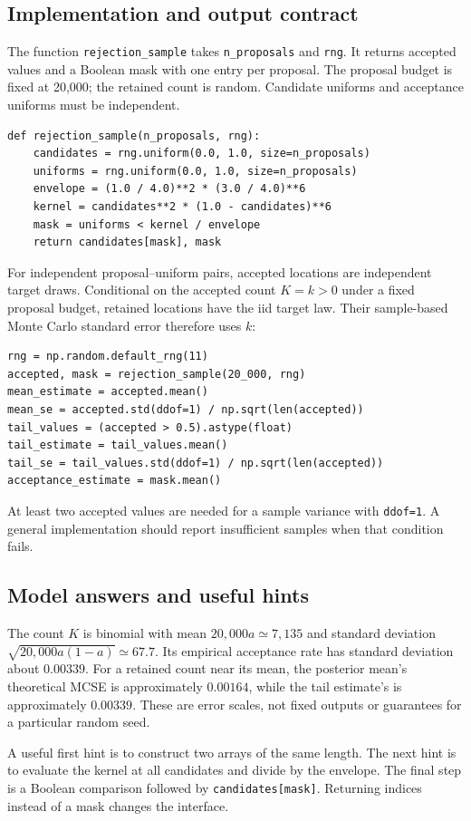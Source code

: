 \documentclass[11pt,a4paper]{article}
\begin{document}
\subsection{Implementation and output contract}
The function \texttt{rejection\_sample} takes \texttt{n\_proposals} and
\texttt{rng}. It returns accepted values and a Boolean mask with one entry per proposal. The proposal
budget is fixed at 20,000; the retained count is random. Candidate uniforms
and acceptance uniforms must be independent.
\begin{lstlisting}
def rejection_sample(n_proposals, rng):
    candidates = rng.uniform(0.0, 1.0, size=n_proposals)
    uniforms = rng.uniform(0.0, 1.0, size=n_proposals)
    envelope = (1.0 / 4.0)**2 * (3.0 / 4.0)**6
    kernel = candidates**2 * (1.0 - candidates)**6
    mask = uniforms < kernel / envelope
    return candidates[mask], mask
\end{lstlisting}
For independent proposal--uniform pairs, accepted locations are independent
target draws. Conditional on the accepted count $K=k>0$ under a fixed proposal
budget, retained locations have the iid target law. Their sample-based
Monte Carlo standard error therefore uses $k$:
\begin{lstlisting}
rng = np.random.default_rng(11)
accepted, mask = rejection_sample(20_000, rng)
mean_estimate = accepted.mean()
mean_se = accepted.std(ddof=1) / np.sqrt(len(accepted))
tail_values = (accepted > 0.5).astype(float)
tail_estimate = tail_values.mean()
tail_se = tail_values.std(ddof=1) / np.sqrt(len(accepted))
acceptance_estimate = mask.mean()
\end{lstlisting}
At least two accepted values are needed for a sample variance with
\texttt{ddof=1}. A general implementation should report insufficient samples
when that condition fails.

\subsection{Model answers and useful hints}
The count $K$ is binomial with mean $20{,}000a\simeq7{,}135$ and standard
deviation $\sqrt{20{,}000a(1-a)}\simeq67.7$. Its empirical acceptance rate
has standard deviation about $0.00339$. For a retained count near its mean,
the posterior mean's theoretical MCSE is approximately $0.00164$, while the
tail estimate's is approximately $0.00339$. These are error scales, not fixed
outputs or guarantees for a particular random seed.

A useful first hint is to construct two arrays of the same length. The next
hint is to evaluate the kernel at all candidates and divide by the envelope.
The final step is a Boolean comparison followed by \texttt{candidates[mask]}.
Returning indices instead of a mask changes the interface.
\end{document}
